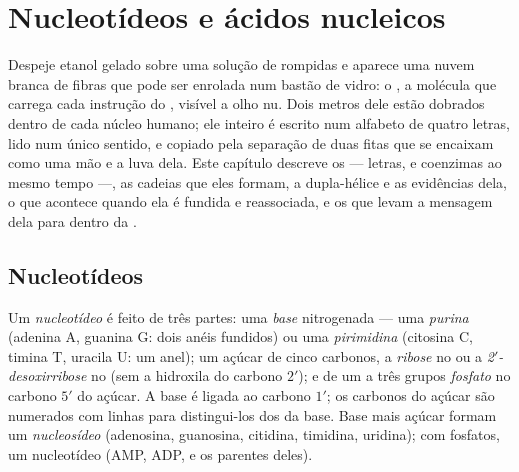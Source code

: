\chapter{Nucleotídeos e ácidos nucleicos}\label{ch:b1:nucleic-acids}

Despeje etanol gelado sobre uma solução de  rompidas e aparece
uma nuvem branca de fibras que pode ser enrolada num bastão de vidro: o
, a molécula que carrega cada instrução do , visível a olho
nu. Dois metros dele estão dobrados dentro de cada núcleo humano; ele
inteiro é escrito num alfabeto de quatro letras, lido num único sentido,
e copiado pela separação de duas fitas que se encaixam como uma mão e a
luva dela. Este capítulo descreve os  --- letras,  e coenzimas ao mesmo tempo ---, as cadeias que eles formam, a
dupla-hélice e as evidências dela, o que acontece quando ela é fundida e
reassociada, e os  que levam a mensagem dela para dentro da .

\section{Nucleotídeos}

\begin{definition}[Nucleotídeo]\label{def:b1:nucleic-acids:nucleotide}
Um \emph{nucleotídeo} é feito de três partes: uma
\emph{base} nitrogenada --- uma
\emph{purina} (adenina A, guanina G: dois anéis fundidos)
ou uma \emph{pirimidina} (citosina C, timina T,
uracila U: um anel); um açúcar de cinco carbonos, a \emph{ribose} no 
ou a \emph{2$'$-desoxirribose} no  (sem a hidroxila do carbono
$2'$); e de um a três grupos \emph{fosfato} no carbono $5'$ do açúcar. A
base é ligada ao carbono $1'$; os carbonos do açúcar são numerados com
linhas para distingui-los dos da base. Base mais açúcar formam um
\emph{nucleosídeo} (adenosina, guanosina, citidina, timidina, uridina);
com fosfatos, um nucleotídeo (AMP, ADP,  e os parentes deles).
\end{definition}

